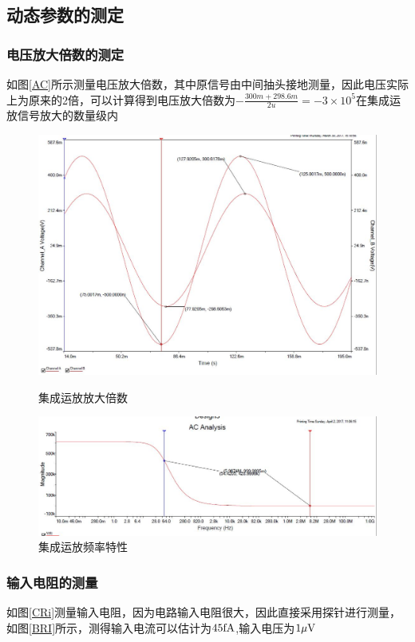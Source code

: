 \documentclass[UTF8,a4paper]{ctexart}
\begin{document}
\subsection{动态参数的测定}
\subsubsection{电压放大倍数的测定}
如图\ref{AC}所示测量电压放大倍数，其中原信号由中间抽头接地测量，因此电压实际上为原来的2倍，可以计算得到电压放大倍数为$-\frac{300m+298.6m}{2u}=-3\times10^5$在集成运放信号放大的数量级内
\begin{figure}
\centering
\includegraphics[width=\textwidth]{3-3A.jpg}
\caption{集成运放放大倍数}
\label{AC}
\includegraphics[width=\textwidth]{3f.JPG}
\caption{集成运放频率特性}
\label{f}
\end{figure}
\subsubsection{输入电阻的测量}
如图\ref{CRi}测量输入电阻，因为电路输入电阻很大，因此直接采用探针进行测量，如图\ref{BRI}所示，测得输入电流可以估计为$45\rm{fA}$,输入电压为$1\mu\rm{V}$
\end{document}
